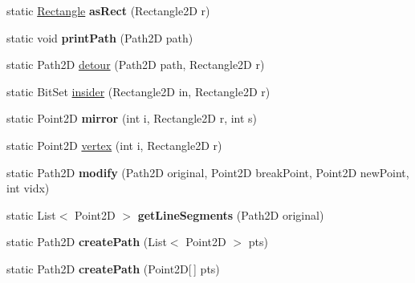 \begin{DoxyCompactItemize}
\item 
\hypertarget{classairhockeyjava_1_1util_1_1_geometry_a6a9bdbb46b21b506dee86269089cd386}{}static \hyperlink{classairhockeyjava_1_1util_1_1_rectangle}{Rectangle} {\bfseries as\+Rect} (Rectangle2\+D r)\label{classairhockeyjava_1_1util_1_1_geometry_a6a9bdbb46b21b506dee86269089cd386}

\item 
\hypertarget{classairhockeyjava_1_1util_1_1_geometry_a1384c735538eb0de1caa7dd6afb55bfb}{}static void {\bfseries print\+Path} (Path2\+D path)\label{classairhockeyjava_1_1util_1_1_geometry_a1384c735538eb0de1caa7dd6afb55bfb}

\item 
static Path2\+D \hyperlink{classairhockeyjava_1_1util_1_1_geometry_a781e43165b9209326937d43aea922ce8}{detour} (Path2\+D path, Rectangle2\+D r)
\item 
static Bit\+Set \hyperlink{classairhockeyjava_1_1util_1_1_geometry_ab9372570e64ecfbe826af91038079d04}{insider} (Rectangle2\+D in, Rectangle2\+D r)
\item 
\hypertarget{classairhockeyjava_1_1util_1_1_geometry_a62d24bd4eb933b5c2101a912847ed65b}{}static Point2\+D {\bfseries mirror} (int i, Rectangle2\+D r, int s)\label{classairhockeyjava_1_1util_1_1_geometry_a62d24bd4eb933b5c2101a912847ed65b}

\item 
static Point2\+D \hyperlink{classairhockeyjava_1_1util_1_1_geometry_a43f122b34eb7f2b64ee6bbd0a117affb}{vertex} (int i, Rectangle2\+D r)
\item 
\hypertarget{classairhockeyjava_1_1util_1_1_geometry_a7ef614abfc2d4274c92260bb7b6a700f}{}static Path2\+D {\bfseries modify} (Path2\+D original, Point2\+D break\+Point, Point2\+D new\+Point, int vidx)\label{classairhockeyjava_1_1util_1_1_geometry_a7ef614abfc2d4274c92260bb7b6a700f}

\item 
\hypertarget{classairhockeyjava_1_1util_1_1_geometry_a07c2d6ff4a3ad125b3d27d387af2ea53}{}static List$<$ Point2\+D $>$ {\bfseries get\+Line\+Segments} (Path2\+D original)\label{classairhockeyjava_1_1util_1_1_geometry_a07c2d6ff4a3ad125b3d27d387af2ea53}

\item 
\hypertarget{classairhockeyjava_1_1util_1_1_geometry_a2aeadfd2bad43afa4f31c970a8a47b9d}{}static Path2\+D {\bfseries create\+Path} (List$<$ Point2\+D $>$ pts)\label{classairhockeyjava_1_1util_1_1_geometry_a2aeadfd2bad43afa4f31c970a8a47b9d}

\item 
\hypertarget{classairhockeyjava_1_1util_1_1_geometry_aed1daa2872e6e0b0401b09830ec0b922}{}static Path2\+D {\bfseries create\+Path} (Point2\+D\mbox{[}$\,$\mbox{]} pts)\label{classairhockeyjava_1_1util_1_1_geometry_aed1daa2872e6e0b0401b09830ec0b922}

\end{DoxyCompactItemize}


